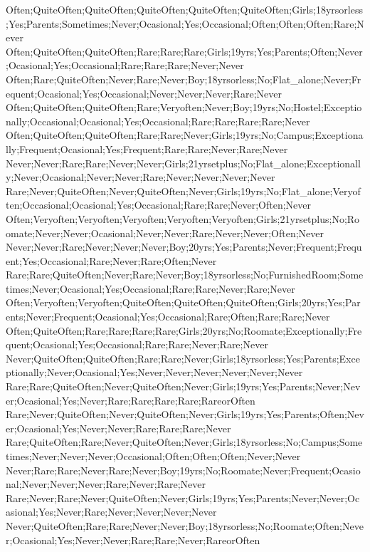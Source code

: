 Often;QuiteOften;QuiteOften;QuiteOften;QuiteOften;QuiteOften;Girls;18yrsorless;Yes;Parents;Sometimes;Never;Ocasional;Yes;Occasional;Often;Often;Often;Rare;Never
Often;QuiteOften;QuiteOften;Rare;Rare;Rare;Girls;19yrs;Yes;Parents;Often;Never;Ocasional;Yes;Occasional;Rare;Rare;Rare;Never;Never
Often;Rare;QuiteOften;Never;Rare;Never;Boy;18yrsorless;No;Flat_alone;Never;Frequent;Ocasional;Yes;Occasional;Never;Never;Never;Rare;Never
Often;QuiteOften;QuiteOften;Rare;Veryoften;Never;Boy;19yrs;No;Hostel;Exceptionally;Occasional;Ocasional;Yes;Occasional;Rare;Rare;Rare;Rare;Never
Often;QuiteOften;QuiteOften;Rare;Rare;Never;Girls;19yrs;No;Campus;Exceptionally;Frequent;Ocasional;Yes;Frequent;Rare;Rare;Never;Rare;Never
Never;Never;Rare;Rare;Never;Never;Girls;21yrsetplus;No;Flat_alone;Exceptionally;Never;Ocasional;Never;Never;Rare;Never;Never;Never;Never
Rare;Never;QuiteOften;Never;QuiteOften;Never;Girls;19yrs;No;Flat_alone;Veryoften;Occasional;Ocasional;Yes;Occasional;Rare;Rare;Never;Often;Never
Often;Veryoften;Veryoften;Veryoften;Veryoften;Veryoften;Girls;21yrsetplus;No;Roomate;Never;Never;Ocasional;Never;Never;Rare;Never;Never;Often;Never
Never;Never;Rare;Never;Never;Never;Boy;20yrs;Yes;Parents;Never;Frequent;Frequent;Yes;Occasional;Rare;Never;Rare;Often;Never
Rare;Rare;QuiteOften;Never;Rare;Never;Boy;18yrsorless;No;FurnishedRoom;Sometimes;Never;Ocasional;Yes;Occasional;Rare;Rare;Never;Rare;Never
Often;Veryoften;Veryoften;QuiteOften;QuiteOften;QuiteOften;Girls;20yrs;Yes;Parents;Never;Frequent;Ocasional;Yes;Occasional;Rare;Often;Rare;Rare;Never
Often;QuiteOften;Rare;Rare;Rare;Rare;Girls;20yrs;No;Roomate;Exceptionally;Frequent;Ocasional;Yes;Occasional;Rare;Rare;Never;Rare;Never
Never;QuiteOften;QuiteOften;Rare;Rare;Never;Girls;18yrsorless;Yes;Parents;Exceptionally;Never;Ocasional;Yes;Never;Never;Never;Never;Never;Never
Rare;Rare;QuiteOften;Never;QuiteOften;Never;Girls;19yrs;Yes;Parents;Never;Never;Ocasional;Yes;Never;Rare;Rare;Rare;Rare;RareorOften
Rare;Never;QuiteOften;Never;QuiteOften;Never;Girls;19yrs;Yes;Parents;Often;Never;Ocasional;Yes;Never;Never;Rare;Rare;Rare;Never
Rare;QuiteOften;Rare;Never;QuiteOften;Never;Girls;18yrsorless;No;Campus;Sometimes;Never;Never;Never;Occasional;Often;Often;Often;Never;Never
Never;Rare;Rare;Never;Rare;Never;Boy;19yrs;No;Roomate;Never;Frequent;Ocasional;Never;Never;Never;Rare;Never;Rare;Never
Rare;Never;Rare;Never;QuiteOften;Never;Girls;19yrs;Yes;Parents;Never;Never;Ocasional;Yes;Never;Rare;Never;Never;Never;Never
Never;QuiteOften;Rare;Rare;Never;Never;Boy;18yrsorless;No;Roomate;Often;Never;Ocasional;Yes;Never;Never;Rare;Rare;Never;RareorOften
